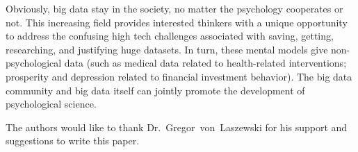 Obviously, big data stay in the society, no matter the psychology 
cooperates or not. This increasing field provides interested 
thinkers with a unique opportunity to address the confusing 
high tech challenges associated with 
saving, getting, researching, and justifying huge datasets. 
In turn, these mental models give
 non-psychological data (such as medical data related to 
health-related interventions; prosperity and depression related to
 financial investment behavior). The big data community and big 
data itself can jointly promote the development of psychological 
science.


\begin{acks}

  The authors would like to thank Dr.~Gregor~von~Laszewski for his
  support and suggestions to write this paper.

\end{acks}



 

